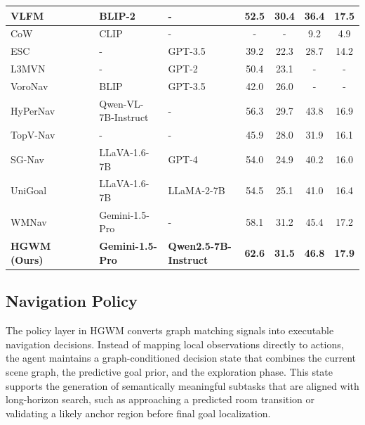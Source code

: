 \documentclass{article}
\newcommand{\cmark}{\ding{51}}
\newcommand{\xmark}{\ding{55}}
\begin{document}
\begin{table}[ht]
{\begin{tabular}{l|c|c|l|l|cc|cc}
VLFM~\citep{yokoyama2024vlfm} & \xmark & \cmark & BLIP-2 & - & 52.5 & 30.4 & 36.4 & 17.5 \\
\hline
CoW~\citep{gadre2023cows} & \cmark & \cmark & CLIP & - & - & - & 9.2 & 4.9 \\
ESC~\citep{zhou2023esc} & \cmark & \cmark & - & GPT-3.5 & 39.2 & 22.3 & 28.7 & 14.2 \\
L3MVN~\citep{yu2023l3mvn} & \cmark & \cmark & - & GPT-2 & 50.4 & 23.1 & - & - \\
VoroNav~\citep{wu2024voronav} & \cmark & \cmark & BLIP & GPT-3.5 & 42.0 & 26.0 & - & - \\
HyPerNav~\citep{yin2025hypernav} & \cmark & \cmark & Qwen-VL-7B-Instruct & - & 56.3 & 29.7 & 43.8 & 16.9 \\
TopV-Nav~\citep{zhong2024topv} & \cmark & \cmark & - & - & 45.9 & 28.0 & 31.9 & 16.1 \\
SG-Nav~\citep{yin2024sg} & \cmark & \cmark & LLaVA-1.6-7B & GPT-4 & 54.0 & 24.9 & 40.2 & 16.0 \\
UniGoal~\citep{yin2025unigoal} & \cmark & \cmark & LLaVA-1.6-7B & LLaMA-2-7B & 54.5 & 25.1 & 41.0 & 16.4 \\
WMNav~\citep{nie2025wmnav} & \cmark & \cmark & Gemini-1.5-Pro & - & 58.1 & 31.2 & 45.4 & 17.2 \\
\hline
\textbf{HGWM (Ours)} & \cmark & \cmark & \textbf{Gemini-1.5-Pro} & \textbf{Qwen2.5-7B-Instruct} & \textbf{62.6} & \textbf{31.5} & \textbf{46.8} & \textbf{17.9} \\
\hline
\end{tabular}}
\vspace{-0.4cm}
\end{table}

\subsection{Navigation Policy}

The policy layer in HGWM converts graph matching signals into executable navigation decisions. Instead of mapping local observations directly to actions, the agent maintains a graph-conditioned decision state that combines the current scene graph, the predictive goal prior, and the exploration phase. This state supports the generation of semantically meaningful subtasks that are aligned with long-horizon search, such as approaching a predicted room transition or validating a likely anchor region before final goal localization.
\end{document}
